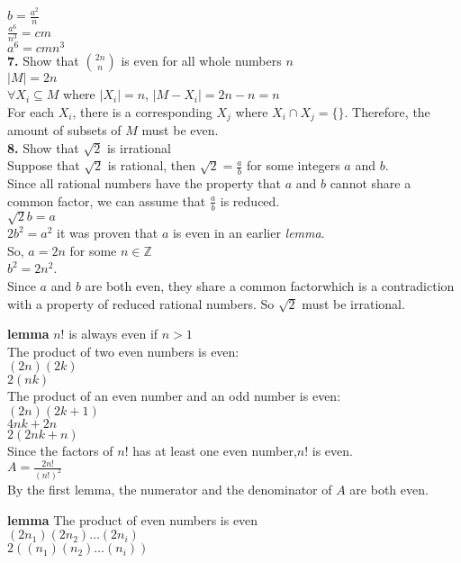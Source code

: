 \documentclass[a4paper,12pt]{article}
\begin{document}
$b=\frac{a^2}{n}$\\
$\frac{a^6}{n^3}=cm$\\
$a^6=cmn^3$\bigskip\\
\textbf{7.} Show that $2n \choose n$ is even for all whole numbers $n$\smallskip\\
$|M|=2n$\\
$\forall X_i \subseteq M$ where $|X_i|=n$, $|M-X_i|=2n-n=n$\\
For each $X_i$, there is a corresponding $X_j$ where $X_i \cap X_j=\{\}$.
Therefore, the amount of subsets of $M$ must be even.\bigskip\\
\textbf{8.} Show that $\sqrt{2}$ is irrational\smallskip\\
Suppose that $\sqrt{2}$ is rational, then $\sqrt{2}=\frac{a}{b}$ for some integers $a$ and $b$.\\
Since all rational numbers have the property that $a$ and $b$ cannot share a common factor, we can assume that $\frac{a}{b}$ is reduced.\\
$\sqrt{2}b=a$\\
$2b^2=a^2$ it was proven that $a$ is even in an earlier \textit{lemma}.\\
So, $a=2n$ for some $n \in \mathbb{Z}$\\
$b^2=2n^2$.\\
Since $a$ and $b$ are both even, they share a common factor\textendash which is a contradiction with a property of reduced rational numbers. So $\sqrt{2}$ must be irrational.






\newpage
\textbf{lemma} $n!$ is always even if $n>1$\\
The product of two even numbers is even:\\
$(2n)(2k)$\\
$2(nk)$\\
The product of an even number and an odd number is even:\\
$(2n)(2k+1)$\\
$4nk+2n$\\
$2(2nk+n)$\\
Since the factors of $n!$ has at least one even number,$n!$ is even.\medskip\\
$A=\frac{2n!}{(n!)^2}$\\
By the first lemma, the numerator and the denominator of $A$ are both even.

\textbf{lemma} The product of even numbers is even\\
$(2n_1)(2n_2)\dots(2n_i)$\\
$2((n_1)(n_2)\dots(n_i))$\medskip\\
\end{document}
